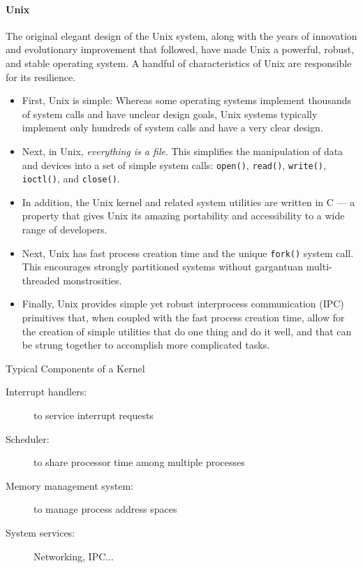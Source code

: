 \paragraph{Unix}

The original elegant design of the Unix system, along with the years of innovation and
evolutionary improvement that followed, have made Unix a powerful, robust, and stable
operating system. A handful of characteristics of Unix are responsible for its
resilience. 

\begin{itemize}
\item First, Unix is simple: Whereas some operating systems implement thousands of system
  calls and have unclear design goals, Unix systems typically implement only hundreds of
  system calls and have a very clear design.
\item Next, in Unix, \emph{everything is a file}. This simplifies the manipulation of data
  and devices into a set of simple system calls: \texttt{open()}, \texttt{read()},
  \texttt{write()}, \texttt{ioctl()}, and \texttt{close()}.
\item In addition, the Unix kernel and related system utilities are written in C --- a
  property that gives Unix its amazing portability and accessibility to a wide range of
  developers.
\item Next, Unix has fast process creation time and the unique \texttt{fork()} system
  call. This encourages strongly partitioned systems without gargantuan multi-threaded
  monstrosities.
\item Finally, Unix provides simple yet robust interprocess communication (IPC) primitives
  that, when coupled with the fast process creation time, allow for the creation of simple
  utilities that do one thing and do it well, and that can be strung together to
  accomplish more complicated tasks.
\end{itemize}

\begin{frame}
  \begin{block}{Typical Components of a Kernel}
    \begin{description}
    \item[Interrupt handlers:] to service interrupt requests
    \item[Scheduler:] to share processor time among multiple processes
    \item[Memory management system:] to manage process address spaces
    \item[System services:] Networking, IPC...
    \end{description}
  \end{block}
\end{frame}

